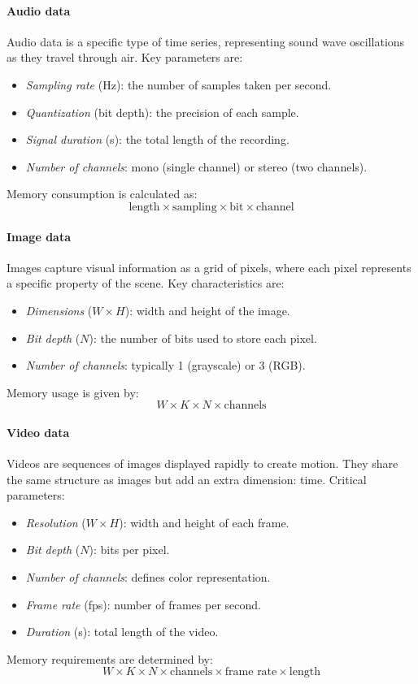 \paragraph*{Audio data}
Audio data is a specific type of time series, representing sound wave oscillations as they travel through air.
Key parameters are:
\begin{itemize}
    \item \textit{Sampling rate} (Hz): the number of samples taken per second.
    \item \textit{Quantization} (bit depth): the precision of each sample.
    \item \textit{Signal duration} (s): the total length of the recording.
    \item \textit{Number of channels}: mono (single channel) or stereo (two channels).
\end{itemize}
\noindent Memory consumption is calculated as:
\[\text{length}\times\text{sampling}\times\text{bit}\times\text{channel}\]

\paragraph*{Image data}
Images capture visual information as a grid of pixels, where each pixel represents a specific property of the scene.
Key characteristics are:
\begin{itemize}
    \item \textit{Dimensions} ($W \times H$): width and height of the image.
    \item \textit{Bit depth} ($N$): the number of bits used to store each pixel.
    \item \textit{Number of channels}: typically 1 (grayscale) or 3 (RGB).
\end{itemize}
\noindent Memory usage is given by:
\[W \times K \times N \times \text{channels}\]

\paragraph{Video data}
Videos are sequences of images displayed rapidly to create motion. 
They share the same structure as images but add an extra dimension: time.
Critical parameters:
\begin{itemize}
    \item \textit{Resolution} ($W \times H$): width and height of each frame.
    \item \textit{Bit depth} ($N$): bits per pixel.
    \item \textit{Number of channels}: defines color representation.
    \item \textit{Frame rate} (fps): number of frames per second.
    \item \textit{Duration} (s): total length of the video.
\end{itemize}
\noindent Memory requirements are determined by:
\[W \times K \times N \times \text{channels} \times \text{frame rate} \times \text{length}\]

